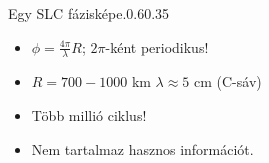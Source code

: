 \begin{frame}{\ft}
    \begin{figp}{}{Egy SLC fázisképe.}{0.6}{0.35}
        \begin{itemize}
            \item $\phi = \frac{4\pi}{\lambda}R$; $2\pi$-ként periodikus!
            \item $R = 700-1000 $ km \hspace{10pt} $\lambda \approx 5$ cm (C-sáv)
            \item Több millió ciklus!
            \item Nem tartalmaz hasznos információt.
        \end{itemize}
    \end{figp}
\end{frame}
